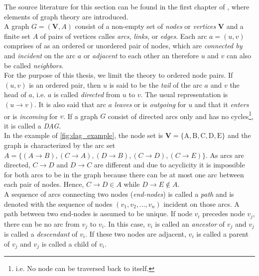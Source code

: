 
The source literature for this section can be found in the first chapter of \cite{nagarajan2013bayesian}, where elements of graph theory are introduced.
\\

A graph $G=(\mathbf{V}, A)$ consist of a non-empty set of \textit{nodes} or \textit{vertices} $\bm{V}$ and a finite set $A$ of pairs of vertices calles \textit{arcs}, \textit{links}, or \textit{edges}. Each arc $a=(u, v)$ comprises of as an ordered or unordered pair of nodes, which are \textit{connected by} and \textit{incident} on the arc $a$ or \textit{adjacent} to each other an therefore $u$ and $v$ can also be called \textit{neighbors}. \\

For the purpose of this thesis, we limit the theory to ordered node pairs. If $(u,v)$ is an ordered pair, then $u$ is said to be the \textit{tail} of the arc $a$ and $v$ the head of $a$, i.e. $a$ is called \textit{directed} from $u$ to $v$. The usual representation is $(u \rightarrow v)$. It is also said that arc $a$ \textit{leaves} or is \textit{outgoing} for $u$ and that it \textit{enters} or is \textit{incoming} for $v$. If a graph $G$ consist of directed arcs only and has no cycles\footnote{i.e. No node can be traversed back to itself.}, it is called a \textit{\ac{DAG}}. \\ In the example of \autoref{fig:dag_example}, the node set is $\mathbf{V}=\{\mathrm{A}, \mathrm{B}, \mathrm{C}, \mathrm{D}, \mathrm{E}\}$ and the graph is characterized by the arc set $A=\{(A \rightarrow B),(C \rightarrow A),(D \rightarrow B),(C \rightarrow D),(C \rightarrow E)\}$. As arcs are directed, $C \rightarrow D$ and $D \rightarrow C$ are different and due to acyclicity it is impossible for both arcs to be in the graph because there can be at most one arc between each pair of nodes. Hence, $C \rightarrow D \in A$ while $D \rightarrow E \notin A$.
\\

A sequence of arcs connecting two nodes (\textit{end-nodes}) is called a \textit{path} and is denoted with the sequence of nodes $\left(v_{1}, v_{2}, \ldots, v_{n}\right)$ incident on those arcs. A path between two end-nodes is assumed to be unique. If node $v_i$ precedes node $v_j$, there can be no arc from $v_j$ to $v_i$. In this case, $v_i$ is called an \textit{ancestor} of $v_j$ and $v_j$ is called a \textit{descendant} of $v_i$. If these two nodes are adjacent, $v_i$ is called a parent of $v_j$ and $v_j$ is called a child of $v_i$.
\\

